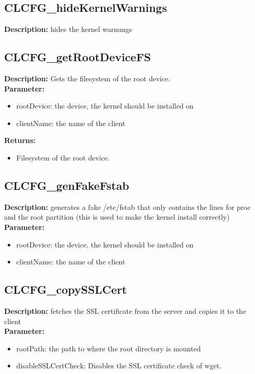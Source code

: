 \subsection{CLCFG\_hideKernelWarnings}
\textbf{Description:} hides the kernel warnungs\\

\subsection{CLCFG\_getRootDeviceFS}
\textbf{Description:} Gets the filesystem of the root device.\\
\textbf{Parameter:}
\begin{itemize}
\item rootDevice: the device, the kernel should be installed on
\item clientName: the name of the client
\end{itemize}
\textbf{Returns:}
\begin{itemize}
\item Filesystem of the root device.
\end{itemize}

\subsection{CLCFG\_genFakeFstab}
\textbf{Description:} generates a fake /etc/fstab that only contains the lines for proc and the root partition (this is used to make the kernel install correctly)\\
\textbf{Parameter:}
\begin{itemize}
\item rootDevice: the device, the kernel should be installed on
\item clientName: the name of the client
\end{itemize}

\subsection{CLCFG\_copySSLCert}
\textbf{Description:} fetches the SSL certificate from the server and copies it to the client\\
\textbf{Parameter:}
\begin{itemize}
\item rootPath: the path to where the root directory is mounted
\item disableSSLCertCheck: Disables the SSL certificate check of wget.
\end{itemize}

